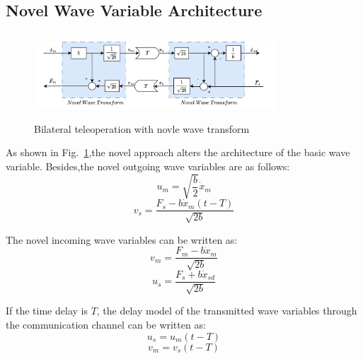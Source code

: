 \subsection{Novel Wave Variable Architecture}
\begin{figure}[htbp]
    \centerline{\includegraphics[height=3.2cm,width=9cm]{novel.jpg}}
    \caption{Bilateral teleoperation with novle wave transform}
    \label{fig3}
\end{figure}
As shown in Fig.~\ref{fig3},the novel approach alters the architecture of the basic wave variable.
Besides,the novel outgoing wave variables are as follows:
\begin{equation}
    u_m = \sqrt{\frac{b}{2}}\dot x_m\label{eq7}
\end{equation}
\begin{equation}
    v_s = \frac{F_s-b\dot x_m(t-T)}{\sqrt{2b}}\label{eq8}
\end{equation}


\par The novel incoming wave variables can be written as:
\begin{equation}
    {{v}_{m}}=\frac{{{F}_{m}}-b{{{\dot{x}}}_{m}}}{\sqrt{2b}}\label{eq9}
\end{equation}
\begin{equation}
    {{u}_{s}}=\frac{{{F}_{s}}+b{{{\dot{x}}}_{sd}}}{\sqrt{2b}}\label{eq10}
\end{equation}
\par If the time delay is $T$, the delay model
of the transmitted wave variables through the communication channel can be written as:
\begin{equation}
    {u_s}={{u}_{m}}(t-T) \label{eqD}
\end{equation}
\begin{equation}
    {{v}_{m}}={{v}_{s}}(t-T) \label{eq11}
\end{equation}


